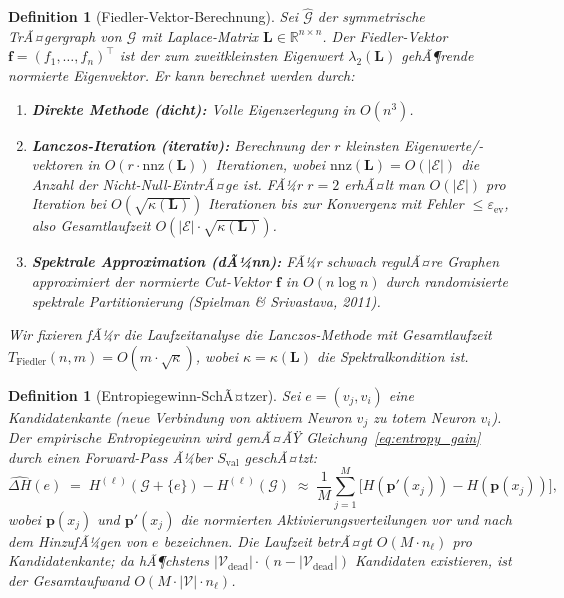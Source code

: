 ﻿\documentclass[12pt, a4paper, openany]{report}
\newtheorem{definition}[theorem]{Definition}
\newcommand{\R}{\mathbb{R}}
\newcommand{\calG}{\mathcal{G}}
\newcommand{\calV}{\mathcal{V}}
\newcommand{\calE}{\mathcal{E}}
\newcommand{\eps}{\varepsilon}
\begin{document}
\begin{definition}[Fiedler-Vektor-Berechnung]
\label{def:fiedler_computation}
Sei $\hat{\calG}$ der symmetrische TrÃ¤gergraph von $\calG$ mit
Laplace-Matrix $\bm{L} \in \R^{n \times n}$.  Der
\emph{Fiedler-Vektor} $\bm{f} = (f_1, \ldots, f_n)^\top$ ist der zum
zweitkleinsten Eigenwert $\lambda_2(\bm{L})$ gehÃ¶rende normierte Eigenvektor.
Er kann berechnet werden durch:
\begin{enumerate}[label=(\roman*)]
  \item \textbf{Direkte Methode (dicht):} Volle Eigenzerlegung in $O(n^3)$.
  \item \textbf{Lanczos-Iteration (iterativ):} Berechnung der $r$ kleinsten
        Eigenwerte/-vektoren in $O(r \cdot \mathrm{nnz}(\bm{L}))$
        Iterationen, wobei $\mathrm{nnz}(\bm{L}) = O(|\calE|)$ die Anzahl
        der Nicht-Null-EintrÃ¤ge ist.  FÃ¼r $r = 2$ erhÃ¤lt man
        $O(|\calE|)$ pro Iteration bei $O(\sqrt{\kappa(\bm{L})})$
        Iterationen bis zur Konvergenz mit Fehler $\leq \eps_{\mathrm{ev}}$, also
        Gesamtlaufzeit $O(|\calE| \cdot \sqrt{\kappa(\bm{L})})$.
  \item \textbf{Spektrale Approximation (dÃ¼nn):} FÃ¼r schwach regulÃ¤re
        Graphen approximiert der normierte Cut-Vektor $\bm{f}$ in
        $O(n \log n)$ durch randomisierte spektrale Partitionierung
        (Spielman \& Srivastava, 2011).
\end{enumerate}
Wir fixieren fÃ¼r die Laufzeitanalyse die Lanczos-Methode mit
Gesamtlaufzeit $T_{\mathrm{Fiedler}}(n, m) = O(m \cdot \sqrt{\kappa})$,
wobei $\kappa = \kappa(\bm{L})$ die Spektralkondition ist.
\end{definition}

\begin{definition}[Entropiegewinn-SchÃ¤tzer]
\label{def:entropy_estimator}
Sei $e = (v_j, v_i)$ eine Kandidatenkante (neue Verbindung von aktivem
Neuron $v_j$ zu totem Neuron $v_i$).  Der \emph{empirische Entropiegewinn}
wird gemÃ¤ÃŸ Gleichung~\eqref{eq:entropy_gain} durch einen Forward-Pass
Ã¼ber $S_{\mathrm{val}}$ geschÃ¤tzt:
\begin{equation}
  \label{eq:entropy_estimator}
  \widehat{\Delta H}(e)
  \;=\;
  H^{(\ell)}(\calG + \{e\}) - H^{(\ell)}(\calG)
  \;\approx\;
  \frac{1}{M}\sum_{j=1}^{M}
  \bigl[H(\bm{p}'(x_j)) - H(\bm{p}(x_j))\bigr],
\end{equation}
wobei $\bm{p}(x_j)$ und $\bm{p}'(x_j)$ die normierten Aktivierungsverteilungen
vor und nach dem HinzufÃ¼gen von $e$ bezeichnen.  Die Laufzeit betrÃ¤gt
$O(M \cdot n_\ell)$ pro Kandidatenkante; da hÃ¶chstens $|\calV_{\mathrm{dead}}| \cdot
(n - |\calV_{\mathrm{dead}}|)$ Kandidaten existieren, ist der Gesamtaufwand
$O(M \cdot |\calV| \cdot n_\ell)$.
\end{definition}
\end{document}
